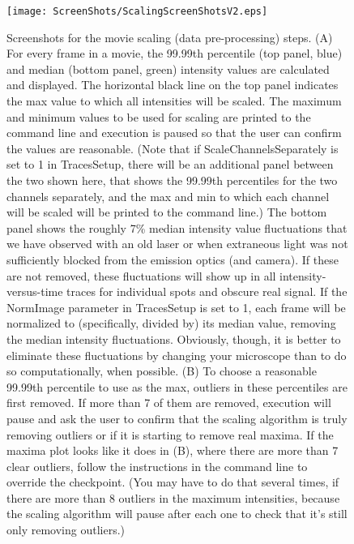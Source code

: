 \documentclass[11pt]{article}
\begin{document}
\begin{figure}
\begin{center}
\texttt{[image: ScreenShots/ScalingScreenShotsV2.eps]}
\caption{Screenshots for the movie scaling (data pre-processing) steps. (A) For every frame in a movie, the 99.99th percentile (top panel, blue) and median (bottom panel, green) intensity values are calculated and displayed.  The horizontal black line on the top panel indicates the max value to which all intensities will be scaled.  %
The maximum and minimum values to be used for scaling are printed to the command line and execution is paused so that the user can confirm the values are reasonable. (Note that if ScaleChannelsSeparately is set to 1 in TracesSetup, there will be an additional panel between the two shown here, that shows the 99.99th percentiles for the two channels separately, and the max and min to which each channel will be scaled will be printed to the command line.)  The bottom panel shows the roughly 7\% median intensity value fluctuations that we have observed with an old laser or when extraneous light was not sufficiently blocked from the emission optics (and camera).  If these are not removed, these fluctuations will show up in all intensity-versus-time traces for individual spots and obscure real signal.  If the NormImage parameter in TracesSetup is set to 1, each frame will be normalized to (specifically, divided by) its median value, removing the median intensity fluctuations. Obviously, though, it is better to eliminate these fluctuations by changing your microscope than to do so computationally, when possible.  (B) To choose a reasonable 99.99th percentile to use as the max, outliers in these percentiles are first removed. If more than 7 of them are removed, execution will pause and ask the user to confirm that the scaling algorithm is truly removing outliers or if it is starting to remove real maxima.  If the maxima plot looks like it does in (B), where there are more than 7 clear outliers, follow the instructions in the command line to override the checkpoint.  (You may have to do that several times, if there are more than 8 outliers in the maximum intensities, because the scaling algorithm will pause after each one to check that it's still only removing outliers.)}
\label{fig:ScaleMovieShot}
\end{center}
\end{figure}
\end{document}
